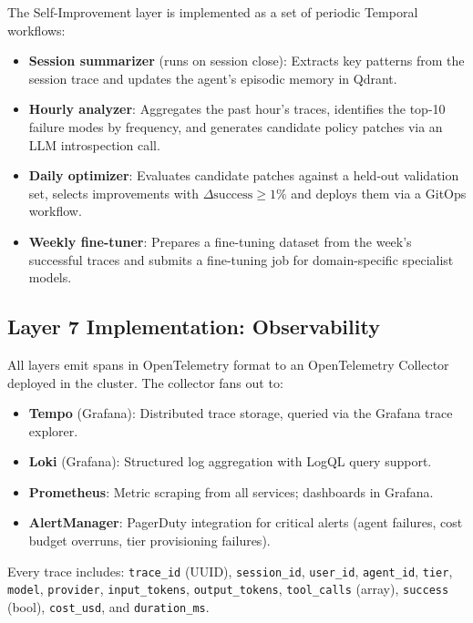 \documentclass[11pt]{article}
\begin{document}
The Self-Improvement layer is implemented as a set of periodic Temporal
workflows:
\begin{itemize}[leftmargin=1.5em]
    \item \textbf{Session summarizer} (runs on session close): Extracts key
          patterns from the session trace and updates the agent's episodic
          memory in Qdrant.
    \item \textbf{Hourly analyzer}: Aggregates the past hour's traces,
          identifies the top-10 failure modes by frequency, and generates
          candidate policy patches via an LLM introspection call.
    \item \textbf{Daily optimizer}: Evaluates candidate patches against a
          held-out validation set, selects improvements with
          $\Delta\text{success} \geq 1\%$ and deploys them via a GitOps
          workflow.
    \item \textbf{Weekly fine-tuner}: Prepares a fine-tuning dataset from
          the week's successful traces and submits a fine-tuning job for
          domain-specific specialist models.
\end{itemize}

\subsection{Layer 7 Implementation: Observability}

All layers emit spans in OpenTelemetry format to an OpenTelemetry
Collector deployed in the cluster. The collector fans out to:
\begin{itemize}[leftmargin=1.5em]
    \item \textbf{Tempo} (Grafana): Distributed trace storage, queried
          via the Grafana trace explorer.
    \item \textbf{Loki} (Grafana): Structured log aggregation with
          LogQL query support.
    \item \textbf{Prometheus}: Metric scraping from all services;
          dashboards in Grafana.
    \item \textbf{AlertManager}: PagerDuty integration for critical
          alerts (agent failures, cost budget overruns, tier provisioning
          failures).
\end{itemize}

Every trace includes: \texttt{trace\_id} (UUID), \texttt{session\_id},
\texttt{user\_id}, \texttt{agent\_id}, \texttt{tier}, \texttt{model},
\texttt{provider}, \texttt{input\_tokens}, \texttt{output\_tokens},
\texttt{tool\_calls} (array), \texttt{success} (bool), \texttt{cost\_usd},
and \texttt{duration\_ms}.
\end{document}
